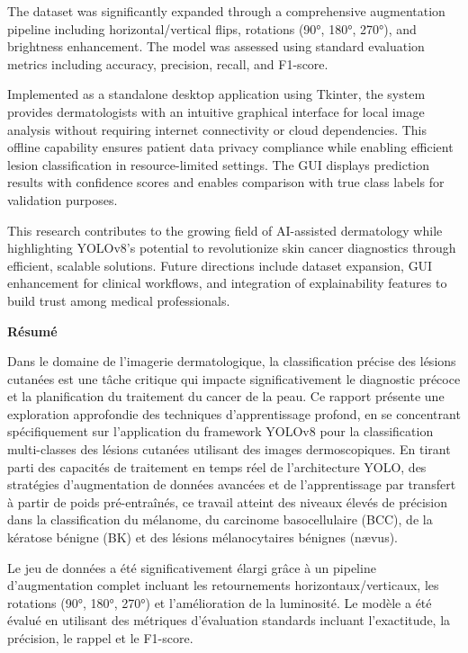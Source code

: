 \documentclass[a4paper,12pt]{report}
\begin{document}
\begin{spacing}{1.5}
    The dataset was significantly expanded through a comprehensive augmentation pipeline including horizontal/vertical flips, rotations (90°, 180°, 270°), and brightness enhancement. The model was assessed using standard evaluation metrics including accuracy, precision, recall, and F1-score. 
    
    Implemented as a standalone desktop application using Tkinter, the system provides dermatologists with an intuitive graphical interface for local image analysis without requiring internet connectivity or cloud dependencies. This offline capability ensures patient data privacy compliance while enabling efficient lesion classification in resource-limited settings. The GUI displays prediction results with confidence scores and enables comparison with true class labels for validation purposes.
    
    This research contributes to the growing field of AI-assisted dermatology while highlighting YOLOv8's potential to revolutionize skin cancer diagnostics through efficient, scalable solutions. Future directions include dataset expansion, GUI enhancement for clinical workflows, and integration of explainability features to build trust among medical professionals.
    
    \newpage
    \begin{center}
    \textbf{\huge Résumé}
    \end{center}
    
    Dans le domaine de l'imagerie dermatologique, la classification précise des lésions cutanées est une tâche critique qui impacte significativement le diagnostic précoce et la planification du traitement du cancer de la peau. Ce rapport présente une exploration approfondie des techniques d'apprentissage profond, en se concentrant spécifiquement sur l'application du framework YOLOv8 pour la classification multi-classes des lésions cutanées utilisant des images dermoscopiques. En tirant parti des capacités de traitement en temps réel de l'architecture YOLO, des stratégies d'augmentation de données avancées et de l'apprentissage par transfert à partir de poids pré-entraînés, ce travail atteint des niveaux élevés de précision dans la classification du mélanome, du carcinome basocellulaire (BCC), de la kératose bénigne (BK) et des lésions mélanocytaires bénignes (nævus).

    Le jeu de données a été significativement élargi grâce à un pipeline d'augmentation complet incluant les retournements horizontaux/verticaux, les rotations (90°, 180°, 270°) et l'amélioration de la luminosité. Le modèle a été évalué en utilisant des métriques d'évaluation standards incluant l'exactitude, la précision, le rappel et le F1-score.
    

\end{spacing}
\end{document}
